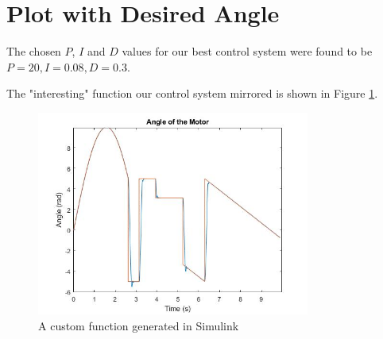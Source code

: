 \section{Plot with Desired Angle}
The chosen $P$, $I$ and $D$ values for our best control system were found to be \(P = 20, I = 0.08, D = 0.3\). 

The "interesting" function our control system mirrored is shown in Figure \ref{fig:interesting}. 
\begin{figure}[H]
	\centering
	\includegraphics[width=0.8\textwidth]{./figures/lab3_custom_function.jpg}
	\caption{A custom function generated in Simulink}
	\label{fig:interesting}
\end{figure}

